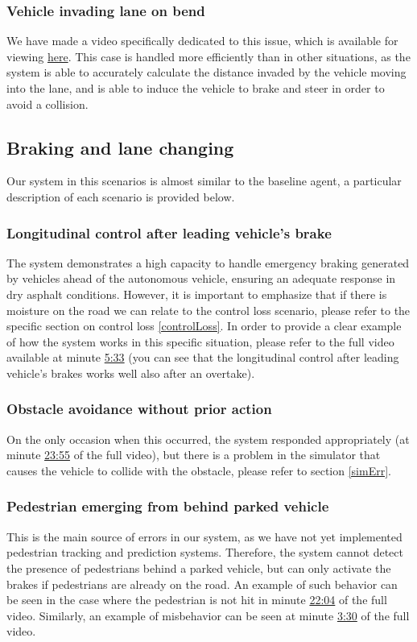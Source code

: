 \documentclass{article}
\begin{document}
\subsubsection{Vehicle invading lane on bend}
We have made a video specifically dedicated to this issue, which is available for viewing \href{https://youtu.be/KME91FAB5ko}{here}. This case is handled more efficiently than in other situations,
as the system is able to accurately calculate the distance invaded by the vehicle moving into the lane, and is able to induce the vehicle to brake and steer in
order to avoid a collision.

\subsection{Braking and lane changing}
Our system in this scenarios is almost similar to the baseline agent, a particular description of each scenario is provided below.
\subsubsection{Longitudinal control after leading vehicle’s brake}
The system demonstrates a high capacity to handle emergency braking generated by vehicles ahead of the autonomous vehicle, ensuring an adequate response in
dry asphalt conditions. However, it is important to emphasize that if there is moisture on the road we can relate to the control loss scenario, please refer to the specific section on control loss \ref{controlLoss}.
In order to provide a clear example of how the system works in this specific situation, please refer to the full video available at minute \href{https://youtu.be/RBGWd_so80U?t=333}{5:33} (you can see that the longitudinal control after leading vehicle's brakes works well also after an overtake).
\subsubsection{Obstacle avoidance without prior action}
On the only occasion when this occurred, the system responded appropriately (at minute \href{https://youtu.be/RBGWd_so80U?t=1435}{23:55} of the full video),
but there is a problem in the simulator that causes the vehicle to collide with the obstacle, please refer to section \ref{simErr}.
\subsubsection{Pedestrian emerging from behind parked vehicle}
This is the main source of errors in our system, as we have not yet implemented pedestrian tracking and prediction systems. Therefore, the system cannot detect
the presence of pedestrians behind a parked vehicle, but can only activate the brakes if pedestrians are already on the road. An example of such behavior can
be seen in the case where the pedestrian is not hit in minute \href{https://youtu.be/RBGWd_so80U?t=1324}{22:04} of the full video. Similarly, an example of misbehavior can be seen at
minute \href{https://youtu.be/RBGWd_so80U?t=210}{3:30} of the full video.
\end{document}

